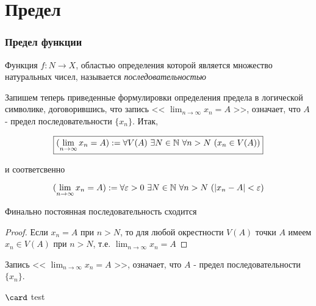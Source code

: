 
\part{Предел}


\section{Предел функции}

\begin{definition}
  Функция $f:N \to X$, областью определения которой является множество натуральных чисел,
  называется \it{последовательностью}
\end{definition}

Запишем теперь приведенные формулировки определения предела в логической символике, договорившись,
что запись << $\lim_{n \to \infty}{x_{n}} = A $ >>, означает, что $A$ - предел последовательности $\{ x_{n} \}$. Итак,

\[
  \boxed{
    ( \lim_{n \to \infty}{x_{n}} = A ) := \forall V(A) \ \exists N \in \N \ \forall n > N \ ( x_{n} \in V(A) )
 }
\]

и соответсвенно

\[
  ( \lim_{n \to \infty}{x_{n}} = A ) := \forall \epsilon > 0 \ \exists N \in \N \ \forall n > N \ ( | x_{n} - A | < \epsilon )
\]

\begin{theorem}
  Финально постоянная последовательность сходится
\end{theorem}

\begin{proof}
  Если $x_{n} = A$ при $n>N$, то для любой окрестности $V(A)$ точки $A$ имеем $x_{n} \in V(A)$ при $n>N$,
  т.е. $ \lim_{n \to \infty}{x_{n}} = A$
\end{proof}

\begin{notation}
   Запись << $\lim_{n \to \infty}{x_{n}} = A $ >>, означает, что
   $A$ - предел последовательности $\{ x_{n} \}$.
\end{notation}
$\card$
test
